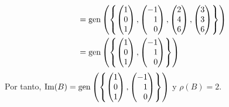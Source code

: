 \begin{example}
\begin{align*}
        & = \Gen \left(\left\{ \begin{pmatrix}
            1 \\
            0 \\
            1
        \end{pmatrix},  \begin{pmatrix*}[r]
            -1 \\
            1 \\
            0
        \end{pmatrix*},  \begin{pmatrix}
            2 \\
            4 \\
            6
        \end{pmatrix},  \begin{pmatrix}
            3 \\
            3 \\
            6
        \end{pmatrix} \right\}\right) \\
        & = \Gen \left(\left\{ \begin{pmatrix}
            1 \\
            0 \\
            1
        \end{pmatrix},  \begin{pmatrix*}[r]
            -1 \\
            1 \\
            0
        \end{pmatrix*} \right\}\right)
    \end{align*}
    Por tanto, $\Ima(B) = \Gen \left(\left\{ \begin{pmatrix}
        1 \\
        0 \\
        1
    \end{pmatrix},  \begin{pmatrix*}[r]
        -1 \\
        1 \\
        0
    \end{pmatrix*} \right\}\right)$ y $\rho(B) = 2$.
\end{example}

